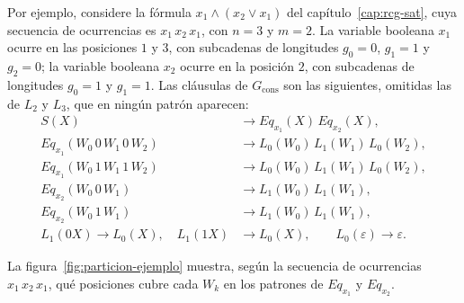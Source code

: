 \documentclass{report}
\theoremstyle{definition}
\theoremstyle{plain}
\begin{document}
Por ejemplo, considere la fórmula $x_1 \wedge (x_2 \vee x_1)$ del
capítulo~\ref{cap:rcg-sat}, cuya secuencia de ocurrencias es
$x_1\,x_2\,x_1$, con $n=3$ y $m=2$. La variable booleana $x_1$ ocurre en las
posiciones $1$ y $3$, con subcadenas de longitudes $g_0=0$, $g_1=1$ y
$g_2=0$; la variable booleana $x_2$ ocurre en la posición $2$, con subcadenas
de longitudes $g_0=1$ y $g_1=1$. Las cláusulas de $G_{\mathrm{cons}}$
son las siguientes, omitidas las de $L_2$ y $L_3$, que en ningún
patrón aparecen:
\[
\begin{aligned}
  S(X) &\to Eq_{x_1}(X)\, Eq_{x_2}(X),\\
  Eq_{x_1}(W_0\,0\,W_1\,0\,W_2) &\to L_0(W_0)\, L_1(W_1)\, L_0(W_2),\\
  Eq_{x_1}(W_0\,1\,W_1\,1\,W_2) &\to L_0(W_0)\, L_1(W_1)\, L_0(W_2),\\
  Eq_{x_2}(W_0\,0\,W_1) &\to L_1(W_0)\, L_1(W_1),\\
  Eq_{x_2}(W_0\,1\,W_1) &\to L_1(W_0)\, L_1(W_1),\\
  L_1(0X) \to L_0(X), \quad L_1(1X) &\to L_0(X), \qquad
  L_0(\varepsilon) \to \varepsilon.
\end{aligned}
\]

La figura~\ref{fig:particion-ejemplo} muestra, según la secuencia de
ocurrencias $x_1\,x_2\,x_1$, qué posiciones cubre cada $W_k$ en los
patrones de $Eq_{x_1}$ y $Eq_{x_2}$.
\end{document}
